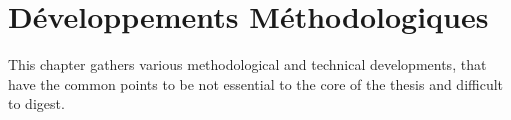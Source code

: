 



\chapter{Développements Méthodologiques}




\label{app:methodology} %





This chapter gathers various methodological and technical developments, that have the common points to be not essential to the core of the thesis and difficult to digest.


\bigskip

